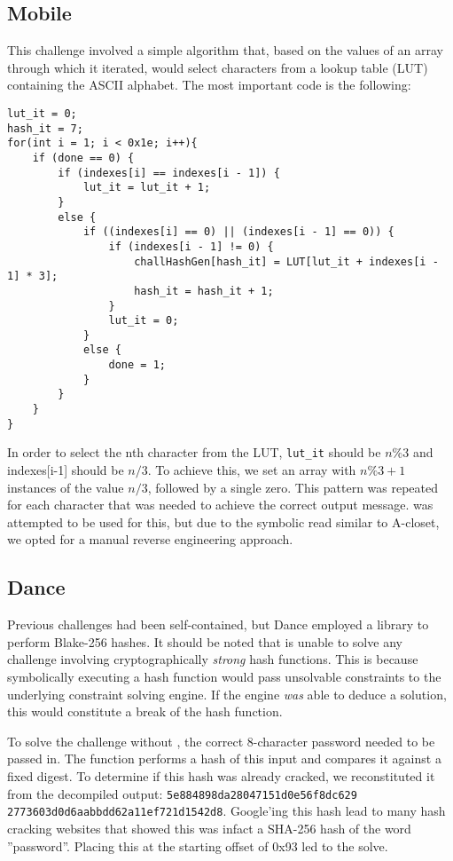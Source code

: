 \subsection{Mobile}
This challenge involved a simple algorithm that, based on the values of an array through which it iterated, would select characters from a lookup table (LUT) containing the ASCII alphabet. The most important code is the following:

\begin{lstlisting}
lut_it = 0;
hash_it = 7;
for(int i = 1; i < 0x1e; i++){
	if (done == 0) {
		if (indexes[i] == indexes[i - 1]) {
			lut_it = lut_it + 1;
		}
		else {
			if ((indexes[i] == 0) || (indexes[i - 1] == 0)) {
				if (indexes[i - 1] != 0) {
					challHashGen[hash_it] = LUT[lut_it + indexes[i - 1] * 3];
					hash_it = hash_it + 1;
				}
				lut_it = 0;
			}
			else {
				done = 1;
			}
		}
	}
}
\end{lstlisting}

In order to select the nth character from the LUT, \texttt{lut\_it} should be $n\%3$ and indexes[i-1] should be $n/3$. To achieve this, we set an array with $n\%3+1$ instances of the value $n/3$, followed by a single zero. This pattern was repeated for each character that was needed to achieve the correct output message. \angr was attempted to be used for this, but due to the symbolic read similar to A-closet, we opted for a manual reverse engineering approach.

\subsection{Dance}
Previous challenges had been self-contained, but Dance employed a library to perform Blake-256 hashes. It should be noted that \angr is unable to solve any challenge involving cryptographically \emph{strong} hash functions. This is because symbolically executing a  hash function would pass unsolvable constraints to the underlying constraint solving engine. If the engine \emph{was} able to deduce a solution, this would constitute a break of the hash function.

To solve the challenge without \angr, the correct 8-character password needed to be passed in.
The function performs a hash of this input and compares it against a fixed digest.
To determine if this hash was already cracked, we reconstituted it from the decompiled \ghidra output: \texttt{5e884898da28047151d0e56f8dc629 2773603d0d6aabbdd62a11ef721d1542d8}. Google'ing this hash lead to many hash cracking websites that showed this was infact a SHA-256 hash of the word ''password''. Placing this at the starting offset of 0x93 led to the solve.

